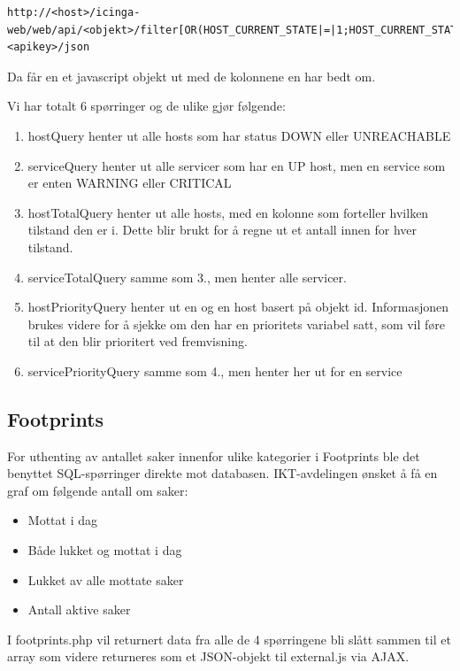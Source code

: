 \begin{lstlisting}
http://<host>/icinga-web/web/api/<objekt>/filter[OR(HOST_CURRENT_STATE|=|1;HOST_CURRENT_STATE|=|2)]/columns[HOST_ID|HOST_CURRENT_CHECK_ATTEMPT|...]/authkey=<apikey>/json
\end{lstlisting}

Da får en et javascript objekt ut med de kolonnene en har bedt om.

Vi har totalt 6 spørringer og de ulike gjør følgende:
\begin{enumerate}
	\item  hostQuery henter ut alle hosts som har status DOWN eller UNREACHABLE
	\item  serviceQuery henter ut alle servicer som har en UP host, men en service som er enten WARNING eller CRITICAL
	\item  hostTotalQuery henter ut alle hosts, med en kolonne som forteller hvilken tilstand den er i. Dette blir brukt for å regne ut et antall innen for hver tilstand.
	\item  serviceTotalQuery samme som 3., men henter alle servicer.
	\item  hostPriorityQuery henter ut en og en host basert på objekt id. Informasjonen brukes videre for å sjekke om den har en prioritets variabel satt, som vil føre til at den blir prioritert ved fremvisning.
	\item  servicePriorityQuery samme som 4., men henter her ut for en service
\end{enumerate}

\subsection{Footprints}

For uthenting av antallet saker innenfor ulike kategorier i Footprints ble det benyttet SQL-spørringer direkte mot databasen. IKT-avdelingen ønsket å få en graf om følgende antall om saker:
\begin{itemize}
	\item Mottat i dag
	\item Både lukket og mottat i dag
	\item Lukket av alle mottate saker
	\item Antall aktive saker
\end{itemize}

I footprints.php vil returnert data fra alle de 4 spørringene bli slått sammen til et array som videre returneres som et JSON-objekt til external.js via AJAX. 

